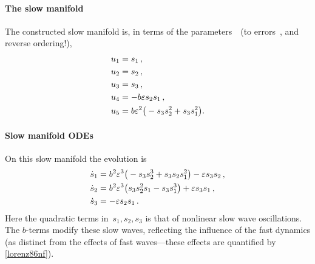 \paragraph{The slow manifold} 
The constructed slow manifold is, in terms of the parameters~\sv\ (to errors~, and reverse ordering!), 
\begin{align*}&
u_{1}=s_{1}
\,, \\&
u_{2}=s_{2}
\,, \\&
u_{3}=s_{3}
\,, \\&
u_{4}=-b \varepsilon s_{2} s_{1}
\,, \\&
u_{5}=b \varepsilon^{2} \big(-s_{3} s_{2}^{2}+s_{3} s_{1}^{2}\big) .
\end{align*}

\paragraph{Slow manifold ODEs} 
On this slow manifold the evolution is
\begin{align*}&
\dot s_{1}=b^{2} \varepsilon^{3} \big(-s_{3} s_{2}^{3}+s_{3} s_{2} s_{1}^{2}
\big)-\varepsilon s_{3} s_{2}
\,, \\&
\dot s_{2}=b^{2} \varepsilon^{3} \big(s_{3} s_{2}^{2} s_{1}-s_{3} s_{1}^{3}
\big)+\varepsilon s_{3} s_{1}
\,, \\&
\dot s_{3}=-\varepsilon s_{2} s_{1}
\,.
\end{align*}
Here the quadratic terms in~\(s_1,s_2,s_3\) is that of nonlinear slow wave oscillations.  The \(b\)-terms modify these slow waves, reflecting the influence of the fast dynamics (as distinct from the effects of fast waves---these effects are quantified by \cref{lorenz86nf}).


